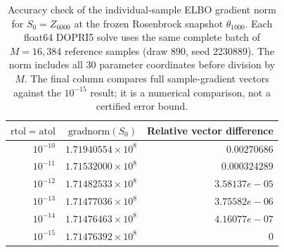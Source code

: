 \begin{table}[htbp]
\centering
\caption{Accuracy check of the individual-sample ELBO gradient norm for $S_0=Z_{6000}$ at the frozen Rosenbrock snapshot $\theta_{1000}$. Each float64 DOPRI5 solve uses the same complete batch of $M=16{,}384$ reference samples (draw 890, seed 2230889). The norm includes all 30 parameter coordinates before division by $M$. The final column compares full sample-gradient vectors against the $10^{-15}$ result; it is a numerical comparison, not a certified error bound.}
\label{tab:sample-gradient-accuracy}
\begin{tabular}{rrr}
\hline
$\mathrm{rtol}=\mathrm{atol}$ & $\mathrm{gradnorm}(S_0)$ & Relative vector difference \\
\hline
$10^{-10}$ & $1.71940554\times10^8$ & $0.00270686$ \\
$10^{-11}$ & $1.71532000\times10^8$ & $0.000324289$ \\
$10^{-12}$ & $1.71482533\times10^8$ & $3.58137e-05$ \\
$10^{-13}$ & $1.71477036\times10^8$ & $3.75582e-06$ \\
$10^{-14}$ & $1.71476463\times10^8$ & $4.16077e-07$ \\
$10^{-15}$ & $1.71476392\times10^8$ & $0$ \\
\hline
\end{tabular}
\end{table}

